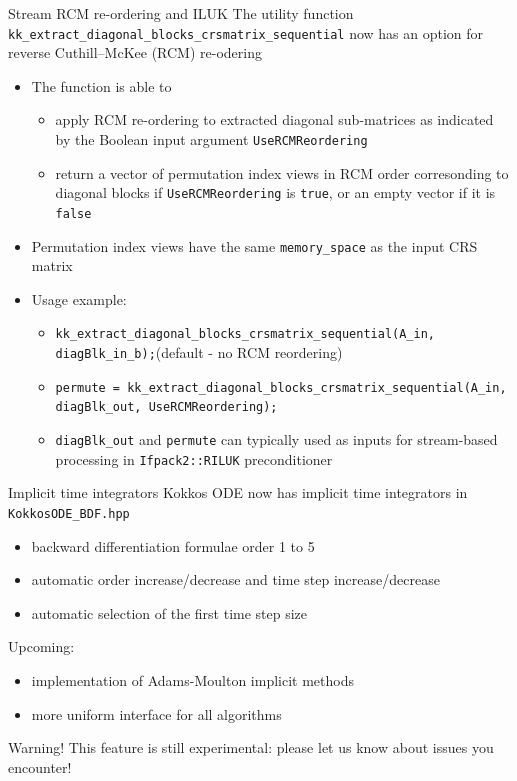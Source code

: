 \begin{frame}{Stream RCM re-ordering and ILUK}
  The utility function \texttt{kk\_extract\_diagonal\_blocks\_crsmatrix\_sequential} now has an option for reverse Cuthill–McKee ({RCM}) re-odering
  \begin{itemize}
    \item The function is able to
      \begin{itemize}
        \item apply {RCM} re-ordering to extracted diagonal sub-matrices as indicated by the Boolean input argument \texttt{UseRCMReordering}
        \item return a vector of permutation index views in RCM order corresonding to diagonal blocks if \texttt{UseRCMReordering} is \texttt{true}, or an empty vector if it is \texttt{false}
      \end{itemize}
    \item Permutation index views have the same \texttt{memory\_space} as the input CRS matrix 
    \item Usage example:
      \begin{itemize}
        \item \texttt{kk\_extract\_diagonal\_blocks\_crsmatrix\_sequential(A\_in, diagBlk\_in\_b);}(default - no RCM reordering)
        \item \texttt{permute = kk\_extract\_diagonal\_blocks\_crsmatrix\_sequential(A\_in, diagBlk\_out, UseRCMReordering);}
        \item \texttt{diagBlk\_out} and \texttt{permute} can typically used as inputs for stream-based processing in \texttt{Ifpack2::RILUK} preconditioner
      \end{itemize} 
  \end{itemize}
\end{frame}



\begin{frame}{Implicit time integrators}
Kokkos ODE now has implicit time integrators in {\tt KokkosODE\_BDF.hpp}
\begin{itemize}
\item backward differentiation formulae order 1 to 5
\item automatic order increase/decrease and time step increase/decrease
\item automatic selection of the first time step size
\end{itemize}

Upcoming:
\begin{itemize}
\item implementation of Adams-Moulton implicit methods
\item more uniform interface for all algorithms
\end{itemize}

\begin{block}{Warning!}
This feature is still experimental: please let us know about issues you encounter!
\end{block}
\end{frame}

